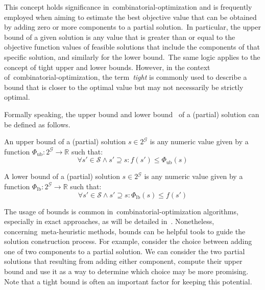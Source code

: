This concept holds significance in~\acrshort{combinatorial-optimization} and is
frequently employed when aiming to estimate the best objective value that can be
obtained by adding zero or more components to a partial solution.~In particular,
the upper bound of a given solution is any value that is greater than or equal
to the objective function values of feasible solutions that include the
components of that specific solution, and similarly for the lower bound.~The
same logic applies to the concept of tight upper and lower bounds. However, in
the context of~\acrshort{combinatorial-optimization}, the term~\emph{tight} is
commonly used to describe a bound that is closer to the optimal value but may
not necessarily be strictly optimal.

Formally speaking, the upper bound and lower
bound~\cite{papadimitriou1998combinatorial,outeiro2021application} of a
(partial) solution can be defined as follows.

\begin{definition}
  \label{def:upper-bound}
  An upper bound of a (partial) solution $s \in 2^\mathcal{G}$ is any numeric
  value given by a function $\Phi_\text{ub}\colon 2^{\mathcal{G}} \rightarrow
    \mathbb{R} $ such that:
  \begin{equation}
    \forall s' \in \mathcal{S} \land s' \supseteq s \colon f(s') \le \Phi_\text{ub}(s)
  \end{equation}
\end{definition}

\begin{definition}
  \label{def:lower-bound}
  A lower bound of a (partial) solution $s \in 2^\mathcal{G}$ is any numeric
  value given by a function $\Phi_\text{lb}\colon 2^{\mathcal{G}} \rightarrow
    \mathbb{R}$ such that:
  \begin{equation}
    \forall s' \in \mathcal{S} \land s' \supseteq s\colon \Phi_\text{lb}(s) \le f(s')
  \end{equation}
\end{definition}

The usage of bounds is common in~\acrshort{combinatorial-optimization}
algorithms, especially in exact approaches, as will be detailed
in~.  Nonetheless, concerning~\acrshort{meta-heuristic}
methods, bounds can be helpful tools to guide the solution construction process.
For example, consider the choice between adding one of two components to a
partial solution. We can consider the two partial solutions that resulting from
adding either component, compute their upper bound and use it as a way to
determine which choice may be more promising. Note that a tight bound is often
an important factor for keeping this potential.


